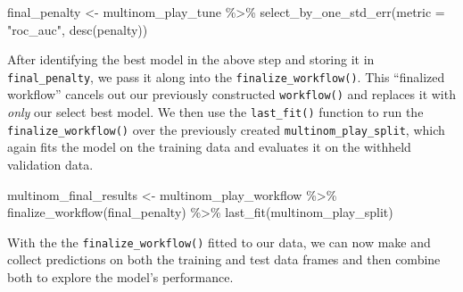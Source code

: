 \documentclass[
  letterpaper,
]{krantz}
\newenvironment{Shaded}{\begin{snugshade}}{\end{snugshade}}
\newcommand{\AttributeTok}[1]{\textcolor[rgb]{0.40,0.45,0.13}{#1}}
\newcommand{\DecValTok}[1]{\textcolor[rgb]{0.68,0.00,0.00}{#1}}
\newcommand{\FunctionTok}[1]{\textcolor[rgb]{0.28,0.35,0.67}{#1}}
\newcommand{\NormalTok}[1]{\textcolor[rgb]{0.00,0.23,0.31}{#1}}
\newcommand{\OtherTok}[1]{\textcolor[rgb]{0.00,0.23,0.31}{#1}}
\newcommand{\SpecialCharTok}[1]{\textcolor[rgb]{0.37,0.37,0.37}{#1}}
\newcommand{\StringTok}[1]{\textcolor[rgb]{0.13,0.47,0.30}{#1}}
\begin{document}
\begin{Shaded}
\begin{Highlighting}[]
\NormalTok{final\_penalty }\OtherTok{\textless{}{-}}\NormalTok{ multinom\_play\_tune }\SpecialCharTok{\%\textgreater{}\%}
  \FunctionTok{select\_by\_one\_std\_err}\NormalTok{(}\AttributeTok{metric =} \StringTok{"roc\_auc"}\NormalTok{, }\FunctionTok{desc}\NormalTok{(penalty))}
\end{Highlighting}
\end{Shaded}

After identifying the best model in the above step and storing it in
\texttt{final\_penalty}, we pass it along into the
\texttt{finalize\_workflow()}. This ``finalized workflow'' cancels out
our previously constructed \texttt{workflow()} and replaces it with
\emph{only} our select best model. We then use the \texttt{last\_fit()}
function to run the \texttt{finalize\_workflow()} over the previously
created \texttt{multinom\_play\_split}, which again fits the model on
the training data and evaluates it on the withheld validation data.

\begin{Shaded}
\begin{Highlighting}[]
\NormalTok{multinom\_final\_results }\OtherTok{\textless{}{-}}\NormalTok{ multinom\_play\_workflow }\SpecialCharTok{\%\textgreater{}\%}
  \FunctionTok{finalize\_workflow}\NormalTok{(final\_penalty) }\SpecialCharTok{\%\textgreater{}\%}
  \FunctionTok{last\_fit}\NormalTok{(multinom\_play\_split)}
\end{Highlighting}
\end{Shaded}

With the the \texttt{finalize\_workflow()} fitted to our data, we can
now make and collect predictions on both the training and test data
frames and then combine both to explore the model's performance.

\begin{Shaded}
\end{Shaded}
\end{document}

